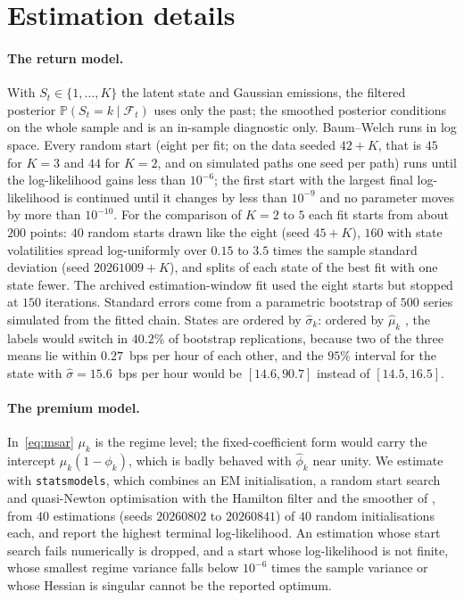 \documentclass[10pt,a4paper]{article}
\newcommand{\Prob}{\mathbb{P}}
\newcommand{\given}{\mid}
\newcommand{\Filt}{\mathcal{F}}
\begin{document}
\appendix
\section{Estimation details}\label{app:estimation}
\renewcommand{\theequation}{A\arabic{equation}}
\setcounter{equation}{0}

\paragraph{The return model.} With $S_t\in\{1,\dots,K\}$ the latent state and Gaussian emissions, the filtered posterior $\Prob(S_t=k\given\Filt_t)$ uses only the past; the smoothed posterior conditions on the whole sample and is an in-sample diagnostic only. Baum--Welch runs in log space. Every random start (eight per fit; on the data seeded $42 + K$, that is $45$ for $K = 3$ and $44$ for $K = 2$, and on simulated paths one seed per path) runs until the log-likelihood gains less than $10^{-6}$; the first start with the largest final log-likelihood is continued until it changes by less than $10^{-9}$ and no parameter moves by more than $10^{-10}$. For the comparison of $K = 2$ to $5$ each fit starts from about $200$ points: $40$ random starts drawn like the eight (seed $45 + K$), $160$ with state volatilities spread log-uniformly over $0.15$ to $3.5$ times the sample standard deviation (seed $20261009 + K$), and splits of each state of the best fit with one state fewer. The archived estimation-window fit used the eight starts but stopped at $150$ iterations. Standard errors come from a parametric bootstrap of $500$ series simulated from the fitted chain. States are ordered by $\hat\sigma_k$: ordered by $\hat\mu_k$ \citep{stephens2000label}, the labels would switch in $40.2\%$ of bootstrap replications, because two of the three means lie within $0.27$~bps per hour of each other, and the $95\%$ interval for the state with $\hat\sigma = 15.6$~bps per hour would be $[14.6, 90.7]$ instead of $[14.5, 16.5]$.

\paragraph{The premium model.} In~\eqref{eq:msar} $\mu_k$ is the regime level; the fixed-coefficient form would carry the intercept $\mu_k(1-\phi_k)$, which is badly behaved with $\hat\phi_k$ near unity. We estimate with \texttt{statsmodels}, which combines an EM initialisation, a random start search and quasi-Newton optimisation with the Hamilton filter and the smoother of \citet{kim1994dynamic}, from $40$ estimations (seeds $20260802$ to $20260841$) of $40$ random initialisations each, and report the highest terminal log-likelihood. An estimation whose start search fails numerically is dropped, and a start whose log-likelihood is not finite, whose smallest regime variance falls below $10^{-6}$ times the sample variance or whose Hessian is singular cannot be the reported optimum.
\end{document}
